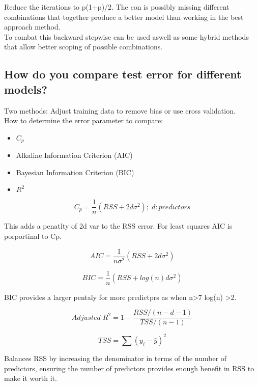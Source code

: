 \documentclass[11pt]{scrartcl} %
\begin{document}
Reduce the iterations to p(1+p)/2. The con is possibly missing different combinations that together
produce a better model than working in the best approach method.\\

To combat this backward stepwise can be used aswell as some hybrid methods that allow better scoping of
possible combinations.

\subsection{How do you compare test error for different models?}

Two methods: Adjust training data to remove bias or use cross validation.\\

How to determine the error parameter to compare:

\begin{itemize}
	\item \(C_p\)
	\item Alkaline Information Criterion (AIC)
	\item Bayesian Information Criterion (BIC)
	\item \(R^2\)
\end{itemize}

\begin{equation}
	C_p = \frac{1}{n}(RSS+2d\sigma^2);\; d:predictors
\end{equation}

This adds a penatlty of 2d var to the RSS error. For least squares AIC is porportinal to Cp.

\begin{equation}
	AIC = \frac{1}{n\sigma^2}(RSS+2d\sigma^2)
\end{equation}

\begin{equation}
	BIC = \frac{1}{n}(RSS + log(n)d\sigma^2)
\end{equation}

BIC provides a larger pentaly for more predictprs as when n>7 log(n) >2.

\begin{equation}
	Adjusted\; R^2 = 1 - \frac{RSS/(n-d-1)}{TSS/(n-1)}
\end{equation}

\begin{equation}
	TSS = \sum{(y_i - \bar{y})^2}
\end{equation}

Balances RSS by increasing the denominator in terms of the number of predictors, ensuring
the number of predictors provides enough benefit in RSS to make it worth it.
\end{document}
